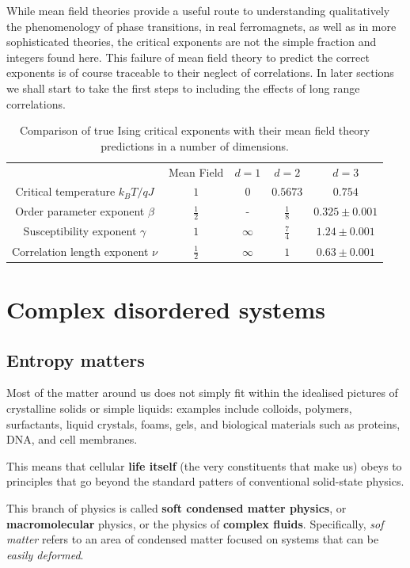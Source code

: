 \documentclass[
  letterpaper,
  enabledeprecatedfontcommands]{report}
\begin{document}
While mean field theories provide a useful route to understanding
qualitatively the phenomenology of phase transitions, in real
ferromagnets, as well as in more sophisticated theories, the critical
exponents are not the simple fraction and integers found here. This
failure of mean field theory to predict the correct exponents is of
course traceable to their neglect of correlations. In later sections we
shall start to take the first steps to including the effects of long
range correlations.

\label{tab-exponents}
\begin{longtable}[]{@{}ccccc@{}}
\caption{Comparison of true Ising critical exponents with their mean
field theory predictions in a number of dimensions.}\tabularnewline
\toprule\noalign{}
\endfirsthead
\endhead
\bottomrule\noalign{}
\endlastfoot
\(\:\) & Mean Field & \(d=1\) & \(d=2\) & \(d=3\) \\
Critical temperature \(k_BT/qJ\) & \(1\) & \(0\) & \(0.5673\) &
\(0.754\) \\
Order parameter exponent \(\beta\) & \(\frac{1}{2}\) & - &
\(\frac{1}{8}\) & \(0.325 \pm 0.001\) \\
Susceptibility exponent \(\gamma\) & \(1\) & \(\infty\) &
\(\frac{7}{4}\) & \(1.24 \pm 0.001\) \\
Correlation length exponent \(\nu\) & \(\frac{1}{2}\) & \(\infty\) &
\(1\) & \(0.63\pm 0.001\) \\
\end{longtable}

\part{Complex disordered systems}

\chapter{Entropy matters}\label{entropy-matters}

Most of the matter around us does not simply fit within the idealised
pictures of crystalline solids or simple liquids: examples include
colloids, polymers, surfactants, liquid crystals, foams, gels, and
biological materials such as proteins, DNA, and cell membranes.

This means that cellular \textbf{life itself} (the very constituents
that make us) obeys to principles that go beyond the standard patters of
conventional solid-state physics.

This branch of physics is called \textbf{soft condensed matter physics},
or \textbf{macromolecular} physics, or the physics of \textbf{complex
fluids}. Specifically, \emph{sof matter} refers to an area of condensed
matter focused on systems that can be \emph{easily deformed}.
\end{document}
